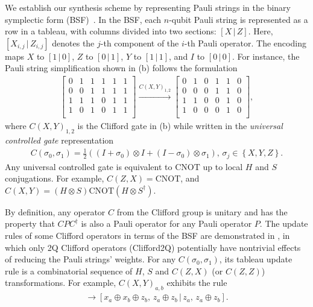 \documentclass[conference,9pt]{IEEEtran}
\newcommand{\CNOT}{\mathrm{CNOT}}
\begin{document}
We establish our synthesis scheme by representing Pauli strings in the binary symplectic form (BSF)~\cite{van2020circuit}. In the BSF, each $n$-qubit Pauli string is represented as a row in a tableau, with columns divided into two sections: $[X\,|\, Z]$. Here, $[X_{i,j} \,|\, Z_{i,j}]$ denotes the $j$-th component of the $i$-th Pauli operator. The encoding maps $X$ to $[1 \,|\, 0]$, $Z$ to $[0 \,|\, 1]$, $Y$ to $[1 \,|\, 1]$, and $I$ to $[0 \,|\, 0]$. For instance, the Pauli string simplification shown in  (b) follows the formulation
    \begin{align*}
        \left[
            \begin{array}{ccc|ccc}
                0 & 1 & 1 & 1 & 1 & 1\\
                0 & 0 & 1 & 1 & 1 & 1\\
                1 & 1 & 1 & 0 & 1 & 1\\
                1 & 0 & 1 & 0 & 1 & 1\\
            \end{array}
        \right]
        \xrightarrow{C(X,Y)_{1,2}}
        \left[
            \begin{array}{ccc|ccc}
                0 & 1 & 0 & 1 & 1 & 0\\
                0 & 0 & 0 & 1 & 1 & 0\\
                1 & 1 & 0 & 0 & 1 & 0\\
                1 & 0 & 0 & 0 & 1 & 0\\
            \end{array}
        \right],
    \end{align*}
    where $ C(X,Y)_{1,2} $ is the Clifford gate in  (b) while written in the \emph{universal controlled gate} representation
    \begin{align*}
        C(\sigma_0, \sigma_1) = \frac{1}{2}((I + \sigma_0)\otimes I + (I - \sigma_0)\otimes \sigma_1),\, \sigma_j\in \left\{X,Y,Z\right\}.
    \end{align*}
    Any universal controlled gate is equivalent to $ \CNOT $ up to local $ H $ and $ S $ conjugations. For example, $ C(Z,X) = \CNOT$, and $ C(X,Y)  =  (H\otimes S) \CNOT (H\otimes S^\dagger) $.

    By definition, any operator $ C $ from the Clifford group is unitary and has the property that $ C P C^\dagger $ is also a Pauli operator for any Pauli operator $ P $. The update rules of some Clifford operators in terms of the BSF are demonstrated in , in which only 2Q Clifford operators (Clifford2Q) potentially have nontrivial effects of reducing the Pauli strings' weights. For any $ C(\sigma_0, \sigma_1) $, its tableau update rule is a combinatorial sequence of $ H $, $ S $ and $ C(Z, X) $ (or $ C(Z, Z) $) transformations. For example, $C(X,Y)_{a,b}$ exhibits the rule
    \begin{align*}
    [x_a,\, x_b\, |\, z_a,\, z_b] \rightarrow [x_a\oplus x_b\oplus z_b,\, z_a\oplus z_b\, |\, z_a,\, z_a\oplus z_b].
    \end{align*}
        
\end{document}

